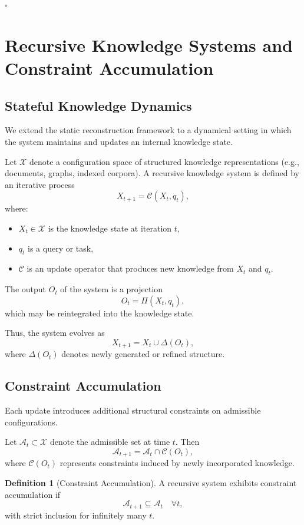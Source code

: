\documentclass[12pt, oneside]{article}
\theoremstyle{plain}
\theoremstyle{definition}
\newtheorem{definition}[theorem]{Definition}
\theoremstyle{remark}
\begin{document}
\hfill $\square$

\section{Recursive Knowledge Systems and Constraint Accumulation}

\subsection{Stateful Knowledge Dynamics}

We extend the static reconstruction framework to a dynamical setting in which the system maintains and updates an internal knowledge state.

Let $\mathcal{X}$ denote a configuration space of structured knowledge representations (e.g., documents, graphs, indexed corpora). A recursive knowledge system is defined by an iterative process
\[
X_{t+1} = \mathcal{C}(X_t, q_t),
\]
where:
\begin{itemize}
\item $X_t \in \mathcal{X}$ is the knowledge state at iteration $t$,
\item $q_t$ is a query or task,
\item $\mathcal{C}$ is an update operator that produces new knowledge from $X_t$ and $q_t$.
\end{itemize}

The output $O_t$ of the system is a projection
\[
O_t = \Pi(X_t, q_t),
\]
which may be reintegrated into the knowledge state.

Thus, the system evolves as
\[
X_{t+1} = X_t \cup \Delta(O_t),
\]
where $\Delta(O_t)$ denotes newly generated or refined structure.

\subsection{Constraint Accumulation}

Each update introduces additional structural constraints on admissible configurations.

Let $\mathcal{A}_t \subset \mathcal{X}$ denote the admissible set at time $t$. Then
\[
\mathcal{A}_{t+1} = \mathcal{A}_t \cap \mathcal{C}(O_t),
\]
where $\mathcal{C}(O_t)$ represents constraints induced by newly incorporated knowledge.

\begin{definition}[Constraint Accumulation]
A recursive system exhibits constraint accumulation if
\[
\mathcal{A}_{t+1} \subseteq \mathcal{A}_t \quad \forall t,
\]
with strict inclusion for infinitely many $t$.
\end{definition}
\end{document}
